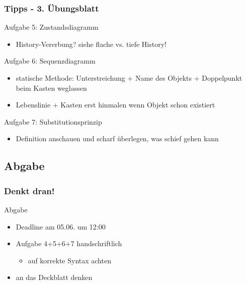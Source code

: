 \documentclass[18pt]{beamer}
\begin{document}
	\begin{frame}
		\frametitle{Tipps - 3. Übungsblatt}
			\begin{exampleblock}{Aufgabe 5: Zustandsdiagramm}
				\begin{itemize}
					\pause
					\item History-Vererbung? siehe flache vs. tiefe History!
				\end{itemize}
			\end{exampleblock}
			\pause
			\begin{exampleblock}{Aufgabe 6: Sequenzdiagramm}
				\begin{itemize}
					\pause
					\item statische Methode: Unterstreichung + Name des Objekts + Doppelpunkt beim Kasten weglassen 
					\pause
					\item Lebenslinie + Kasten erst hinmalen wenn Objekt schon existiert
				\end{itemize}
			\end{exampleblock}
			\pause
			\begin{exampleblock}{Aufgabe 7: Substitutionsprinzip}
				\begin{itemize}
					\item Definition anschauen und scharf überlegen, was schief gehen kann
				\end{itemize}
			\end{exampleblock}
	\end{frame}

	\subsection{Abgabe}
	\begin{frame}
		\frametitle{Denkt dran!}
		\begin{alertblock}{Abgabe}
			\begin{itemize}
				\item Deadline am 05.06. um 12:00
				\item Aufgabe 4+5+6+7 handschriftlich
				\begin{itemize}
					\item auf korrekte Syntax achten
				\end{itemize}
				\item an das Deckblatt denken
			\end{itemize}
		\end{alertblock}
	\end{frame}
		
\end{document}
